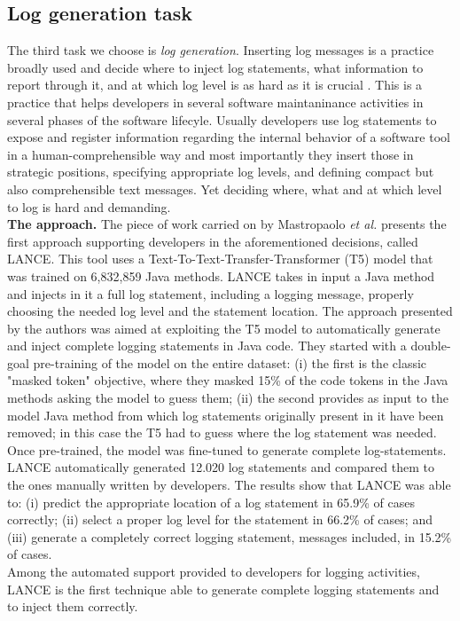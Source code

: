 \subsection{Log generation task}
The third task we choose is \textit{log generation}.
Inserting log messages is a practice broadly used and decide where to inject log statements, what information to report through it, 
and at which log level is as hard as it is crucial \cite{Mastropaolo2022}. 
This is a practice that helps developers in several software maintaninance activities in several 
phases of the software lifecyle. Usually developers use log statements to expose and register information 
regarding the internal behavior of a software tool in a human-comprehensible way and most importantly they insert those
in strategic positions, specifying appropriate log levels, and defining 
compact but also comprehensible text messages. Yet deciding where, what and at which level to log is
hard and demanding.\\ 
\newline
\textbf{The approach.} The piece of work carried on by Mastropaolo \textit{et al.} \cite{Mastropaolo2022} presents the first 
approach supporting developers in the aforementioned decisions, called LANCE. This tool uses 
a Text-To-Text-Transfer-Transformer (T5) model that was trained on 6,832,859 Java methods.
LANCE takes in input a Java method and injects in it a full log statement, including 
a logging message, properly choosing the needed log level and the statement location.
The approach presented by the authors was aimed at exploiting the T5 model to automatically
generate and inject complete logging statements in Java code. 
They started with a double-goal pre-training of the model on the entire dataset: (i) the first is the classic 
"masked token" objective, where they masked 15\% of the code tokens in the Java methods asking the model 
to guess them; (ii) the second provides as input to the model  Java method from which log statements 
originally present in it have been removed; in this case the T5 had to guess
where the log statement was needed. Once pre-trained, the model was fine-tuned 
to generate complete log-statements. LANCE automatically generated 12.020 log statements
and compared them to the ones manually written by developers. The results 
show that LANCE was able to: (i) predict the appropriate location of a log statement 
in 65.9\% of cases correctly; (ii) select a proper log level for the statement in 66.2\% of cases; and 
(iii) generate a completely correct logging statement, messages included, in 15.2\% of cases.\\
\newline
Among the automated support provided to developers for logging activities, LANCE is the first
technique able to generate complete logging statements and to inject them correctly.






